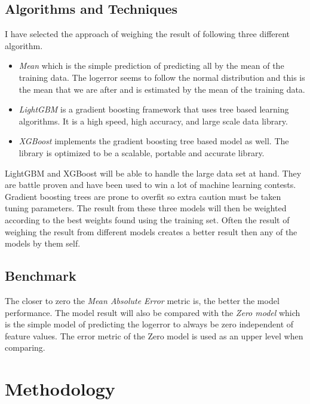 \documentclass[a4paper]{article}
\begin{document}
\subsection{Algorithms and Techniques}
I have selected the approach of weighing the result of following three different algorithm.
\begin{itemize}
    \item
        \textit{Mean} which is the simple prediction of predicting all by the mean of the training data.
        The logerror seems to follow the normal distribution and this is the mean that we are after and is estimated
        by the mean of the training data.
    \item
        \textit{LightGBM} is a gradient boosting framework that uses tree based learning algorithms. It is a
        high speed, high accuracy, and large scale data library.
    \item
        \textit{XGBoost} implements the gradient boosting tree based model as well. The library is optimized to
        be a scalable, portable and accurate library.
\end{itemize}
LightGBM and XGBoost will be able to handle the large data set at hand. They are battle proven and have been used to
win a lot of machine learning contests. Gradient boosting trees are prone to overfit so extra caution must be
taken tuning parameters. The result from these three models will then be weighted according to the best weights
found using the training set. Often the result of weighing the result from different models creates a better result
then any of the models by them self.

\subsection{Benchmark}
The closer to zero the \textit{Mean Absolute Error} metric is, the better the model performance. The model result
will also be compared with the \textit{Zero model} which is the simple model of predicting the logerror
to always be zero independent of feature values. The error metric of the Zero model is used as an upper level
when comparing.


\section{Methodology}
\end{document}
